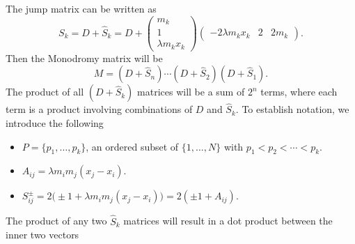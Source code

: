 \documentclass[english,master]{liumaiex}
\theoremstyle{plain}
\theoremstyle{definition}
\begin{document}
The jump matrix can be written as
\begin{equation}
	S_k = D + \hat{S}_k = D + 
	\begin{pmatrix}
		m_k \\ 1 \\ \lambda m_k x_k		
	\end{pmatrix}
	\begin{pmatrix}
		-2 \lambda m_k x_k & 2 & 2 m_k
	\end{pmatrix}.
\end{equation}
Then the Monodromy matrix will be
\begin{equation}
	M = (D + \hat{S}_n)\cdots(D + \hat{S}_2)(D + \hat{S}_1).
\end{equation}
The product of all $(D + \hat{S}_k)$ matrices will be a sum of $2^n$ terms, where each term is a product involving combinations of $D$ and $\hat{S}_k$.
To establish notation, we introduce the following
\begin{itemize}
    \item \( P = \{p_1, \dots, p_k\} \), an ordered subset of \( \{1, \dots, N\} \) with \( p_1 < p_2 < \cdots < p_k \).
    \item \( A_{ij} = \lambda m_i m_j (x_j - x_i) \).
    \item \( S_{ij}^\pm = 2\big(\pm1 + \lambda m_i m_j (x_j - x_i)\big)
		= 2(\pm1 + A_{ij})\).
\end{itemize}
The product of any two $\hat{S}_k$ matrices will result in a dot product between the inner two vectors
\end{document}
